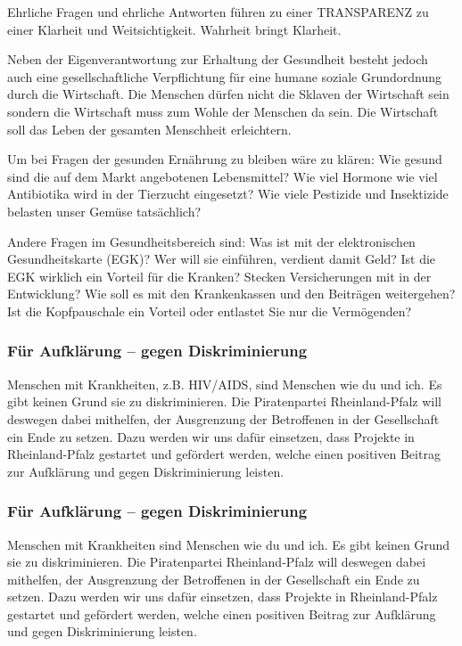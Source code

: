 Ehrliche Fragen und ehrliche Antworten führen zu einer TRANSPARENZ zu einer Klarheit und Weitsichtigkeit. Wahrheit bringt Klarheit.

Neben der Eigenverantwortung zur Erhaltung der Gesundheit besteht jedoch auch eine gesellschaftliche Verpflichtung für eine humane soziale Grundordnung durch die Wirtschaft. Die Menschen dürfen nicht die Sklaven der Wirtschaft sein sondern die Wirtschaft muss zum Wohle der Menschen da sein. Die Wirtschaft soll das Leben der gesamten Menschheit erleichtern.

Um bei Fragen der gesunden Ernährung zu bleiben wäre zu klären: Wie gesund sind die auf dem Markt angebotenen Lebensmittel? Wie viel Hormone wie viel Antibiotika wird in der Tierzucht eingesetzt? Wie viele Pestizide und Insektizide belasten unser Gemüse tatsächlich?

Andere Fragen im Gesundheitsbereich sind: Was ist mit der elektronischen Gesundheitskarte (EGK)? Wer will sie einführen, verdient damit Geld? Ist die EGK wirklich ein Vorteil für die Kranken? Stecken Versicherungen mit in der Entwicklung? Wie soll es mit den Krankenkassen und den Beiträgen weitergehen?
Ist die Kopfpauschale ein Vorteil oder entlastet Sie nur die Vermögenden?
 
\newpage
{}\label{wp:gesundheit:auf1}

\subsubsection{Für Aufklärung – gegen Diskriminierung}
\abstimmung
Menschen mit Krankheiten, z.B. HIV/AIDS, sind Menschen wie du und ich. Es gibt keinen Grund sie zu diskriminieren. Die Piratenpartei Rheinland-Pfalz will deswegen dabei mithelfen, der Ausgrenzung der Betroffenen in der Gesellschaft ein Ende zu setzen. Dazu werden wir uns dafür einsetzen, dass Projekte in Rheinland-Pfalz gestartet und gefördert werden, welche einen positiven Beitrag zur Aufklärung und gegen Diskriminierung leisten.
 
\label{wp:gesundheit:auf2}

\subsubsection{Für Aufklärung – gegen Diskriminierung}
\abstimmung
Menschen mit Krankheiten sind Menschen wie du und ich. Es gibt keinen Grund sie zu diskriminieren. Die Piratenpartei Rheinland-Pfalz will deswegen dabei mithelfen, der Ausgrenzung der Betroffenen in der Gesellschaft ein Ende zu setzen. Dazu werden wir uns dafür einsetzen, dass Projekte in Rheinland-Pfalz gestartet und gefördert werden, welche einen positiven Beitrag zur Aufklärung und gegen Diskriminierung leisten.